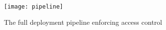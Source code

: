 \begin{figure}[htb]
    \centering
    \texttt{[image: pipeline]}
    \caption{The full deployment pipeline enforcing access control}
    \label{fig:pipeline}
\end{figure}